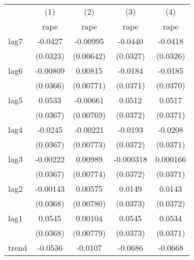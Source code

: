 {
\def\sym#1{\ifmmode^{#1}\else\(^{#1}\)\fi}
\begin{tabular}{l*{4}{c}}
\hline\hline
            &\multicolumn{1}{c}{(1)}&\multicolumn{1}{c}{(2)}&\multicolumn{1}{c}{(3)}&\multicolumn{1}{c}{(4)}\\
            &\multicolumn{1}{c}{rape}&\multicolumn{1}{c}{rape}&\multicolumn{1}{c}{rape}&\multicolumn{1}{c}{rape}\\
\hline
lag7        &     -0.0427         &    -0.00995         &     -0.0440         &     -0.0418         \\
            &    (0.0323)         &   (0.00642)         &    (0.0327)         &    (0.0326)         \\
[1em]
lag6        &    -0.00809         &     0.00815         &     -0.0184         &     -0.0185         \\
            &    (0.0366)         &   (0.00771)         &    (0.0371)         &    (0.0370)         \\
[1em]
lag5        &      0.0533         &    -0.00661         &      0.0512         &      0.0517         \\
            &    (0.0367)         &   (0.00769)         &    (0.0372)         &    (0.0371)         \\
[1em]
lag4        &     -0.0245         &    -0.00221         &     -0.0193         &     -0.0208         \\
            &    (0.0367)         &   (0.00773)         &    (0.0372)         &    (0.0371)         \\
[1em]
lag3        &    -0.00222         &     0.00989         &   -0.000318         &    0.000166         \\
            &    (0.0367)         &   (0.00774)         &    (0.0372)         &    (0.0371)         \\
[1em]
lag2        &    -0.00143         &     0.00575         &      0.0149         &      0.0143         \\
            &    (0.0368)         &   (0.00780)         &    (0.0373)         &    (0.0372)         \\
[1em]
lag1        &      0.0545         &     0.00104         &      0.0545         &      0.0534         \\
            &    (0.0368)         &   (0.00779)         &    (0.0373)         &    (0.0371)         \\
[1em]
trend       &     -0.0536         &     -0.0107         &     -0.0686         &     -0.0668         \\

\end{tabular}}
